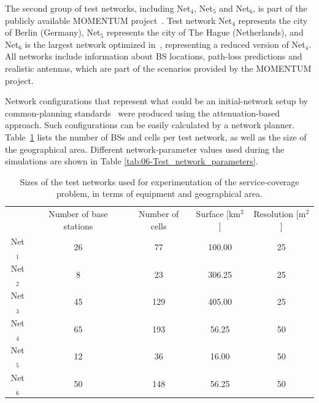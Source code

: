 The second group of test networks, including Net$_{4}$, Net$_{5}$
and Net$_{6}$, is part of the publicly available MOMENTUM project~\cite{Momentum.project}.
Test network Net$_{4}$ represents the city of Berlin (Germany), Net$_{5}$
represents the city of The Hague (Netherlands), and Net$_{6}$ is
the largest network optimized in~\cite{Siomina:Minimum.pilot.power.for.service.coverage},
representing a reduced version of Net$_{4}$. All networks include
information about BS locations, path-loss predictions and realistic
antennas, which are part of the scenarios provided by the MOMENTUM
project.

Network configurations that represent what could be an initial-network
setup by common-planning standards~\cite{WCDMAforUMTS_RadioAccessForThirdGenerationMobileCommunications}
were produced using the attenuation-based approach. Such configurations
can be easily calculated by a network planner. Table~\ref{tab:06-Test_network_sizes}
lists the number of BSs and cells per test network, as well as the
size of the geographical area. Different network-parameter values
used during the simulations are shown in Table \ref{tab:06-Test_network_parameters}.

\begin{table}
\caption{Sizes of the test networks used for experimentation of the service-coverage
problem, in terms of equipment and geographical area.\emph{\label{tab:06-Test_network_sizes}}}


\centering

{\small{}}%
\begin{tabular}{ccccc}
\cmidrule{2-5} 
 & {\small{Number of base stations}} & {\small{Number of cells}} & {\small{Surface {[}km$^{2}${]}}} & {\small{Resolution {[}m$^{2}${]}}}\tabularnewline\addlinespace
\midrule
{\small{Net$_{1}$}} & {\small{26}} & {\small{77}} & {\small{100.00}} & {\small{25}}\tabularnewline
{\small{Net$_{2}$}} & {\small{8}} & {\small{23}} & {\small{306.25}} & {\small{25}}\tabularnewline
{\small{Net$_{3}$}} & {\small{45}} & {\small{129}} & {\small{405.00}} & {\small{25}}\tabularnewline
{\small{Net$_{4}$}} & {\small{65}} & {\small{193}} & {\small{56.25}} & {\small{50}}\tabularnewline
{\small{Net$_{5}$}} & {\small{12}} & {\small{36}} & {\small{16.00}} & {\small{50}}\tabularnewline
{\small{Net$_{6}$}} & {\small{50}} & {\small{148}} & {\small{56.25}} & {\small{50}}\tabularnewline
\bottomrule
\end{tabular}
\end{table}


